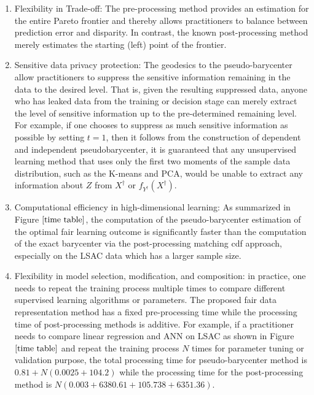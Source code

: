 \documentclass[twoside,11pt]{article}
\begin{document}
\begin{enumerate}
\setlength{\parsep}{-0.2ex}
\setlength{\itemsep}{-0.2ex}
\item Flexibility in Trade-off: The pre-processing method provides an estimation for the entire Pareto frontier and thereby allows practitioners to balance between prediction error and disparity. In contrast, the known post-processing method merely estimates the starting (left) point of the frontier.

\item Sensitive data privacy protection: The geodesics to the pseudo-barycenter allow practitioners to suppress the sensitive information remaining in the data to the desired level. That is, given the resulting suppressed data, anyone who has leaked data from the training or decision stage can merely extract the level of sensitive information up to the pre-determined remaining level. For example, if one chooses to suppress as much sensitive information as possible by setting $t = 1$, then it follows from the construction of dependent and independent pseudobarycenter, it is guaranteed that any unsupervised learning method that uses only the first two moments of the sample data distribution, such as the K-means and PCA, would be unable to extract any information about $Z$ from $X^{\dag}$ or $f_{Y^{\dagger}}(X^{\dag})$.

\item Computational efficiency in high-dimensional learning: As summarized in Figure $\ref{time table}$, the computation of the pseudo-barycenter estimation of the optimal fair learning outcome is significantly faster than the computation of the exact barycenter via the post-processing matching cdf approach, especially on the LSAC data which has a larger sample size.

\item Flexibility in model selection, modification, and composition: in practice, one needs to repeat the training process multiple times to compare different supervised learning algorithms or parameters. The proposed fair data representation method has a fixed pre-processing time while the processing time of post-processing methods is additive. For example, if a practitioner needs to compare linear regression and ANN on LSAC as shown in Figure $\ref{time table}$ and repeat the training process $N$ times for parameter tuning or validation purpose, the total processing time for pseudo-barycenter method is $0.81 + N(0.0025 + 104.2)$ while the processing time for the post-processing method is $N(0.003 + 6380.61 + 105.738 + 6351.36)$.

\end{enumerate}
\end{document}
